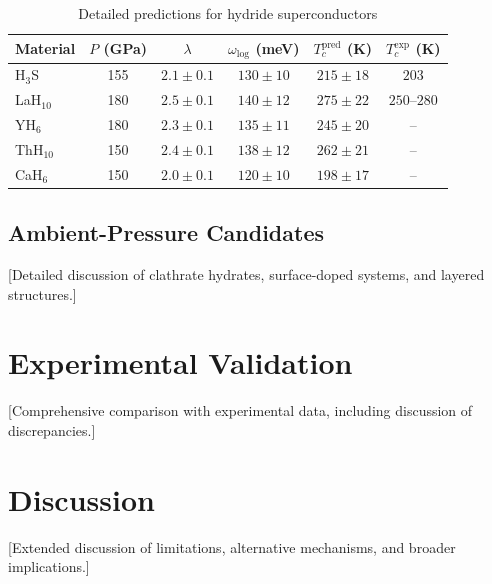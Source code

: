 \documentclass[11pt,a4paper]{article}
\theoremstyle{definition}
\begin{document}
\begin{table}[htbp]
\centering
\caption{Detailed predictions for hydride superconductors}
\label{tab:hydrides}
\begin{tabular}{lccccc}
\toprule
Material & $P$ (GPa) & $\lambda$ & $\omega_{\text{log}}$ (meV) & $T_c^{\text{pred}}$ (K) & $T_c^{\text{exp}}$ (K) \\
\midrule
H$_3$S & 155 & $2.1 \pm 0.1$ & $130 \pm 10$ & $215 \pm 18$ & $203$ \\
LaH$_{10}$ & 180 & $2.5 \pm 0.1$ & $140 \pm 12$ & $275 \pm 22$ & $250$--$280$ \\
YH$_6$ & 180 & $2.3 \pm 0.1$ & $135 \pm 11$ & $245 \pm 20$ & -- \\
ThH$_{10}$ & 150 & $2.4 \pm 0.1$ & $138 \pm 12$ & $262 \pm 21$ & -- \\
CaH$_6$ & 150 & $2.0 \pm 0.1$ & $120 \pm 10$ & $198 \pm 17$ & -- \\
\bottomrule
\end{tabular}
\end{table}

\subsection{Ambient-Pressure Candidates}

[Detailed discussion of clathrate hydrates, surface-doped systems, and layered structures.]

\section{Experimental Validation}\label{sec:validation}

[Comprehensive comparison with experimental data, including discussion of discrepancies.]

\section{Discussion}\label{sec:discussion}

[Extended discussion of limitations, alternative mechanisms, and broader implications.]

\end{document}
